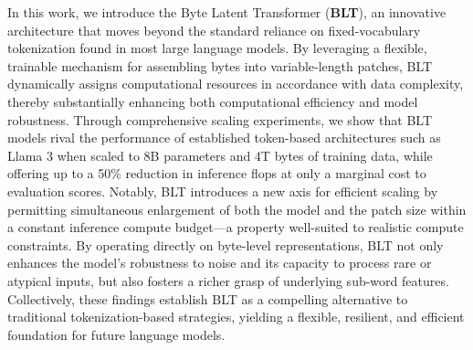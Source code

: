 In this work, we introduce the Byte Latent Transformer (\textbf{BLT}), an innovative architecture that moves beyond the standard reliance on fixed-vocabulary tokenization found in most large language models. By leveraging a flexible, trainable mechanism for assembling bytes into variable-length patches, {\textsc BLT} dynamically assigns computational resources in accordance with data complexity, thereby substantially enhancing both computational efficiency and model robustness. Through comprehensive scaling experiments, we show that {\textsc BLT} models rival the performance of established token-based architectures such as Llama 3 when scaled to 8B parameters and 4T bytes of training data, while offering up to a 50\% reduction in inference flops at only a marginal cost to evaluation scores. Notably, {\textsc BLT} introduces a new axis for efficient scaling by permitting simultaneous enlargement of both the model and the patch size within a constant inference compute budget—a property well-suited to realistic compute constraints. By operating directly on byte-level representations, {\textsc BLT} not only enhances the model’s robustness to noise and its capacity to process rare or atypical inputs, but also fosters a richer grasp of underlying sub-word features. Collectively, these findings establish {\textsc BLT} as a compelling alternative to traditional tokenization-based strategies, yielding a flexible, resilient, and efficient foundation for future language models.

